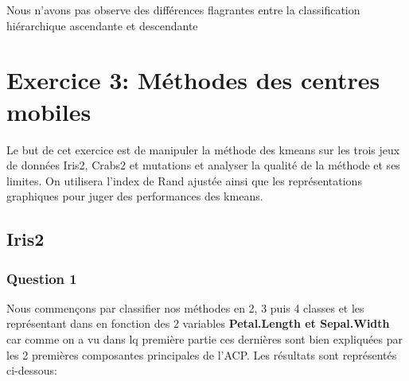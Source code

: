 \documentclass[10pt]{article}
\begin{document}
	Nous n'avons pas observe des différences flagrantes entre la classification hiérarchique ascendante et descendante
	
	\section{ Exercice 3: Méthodes des centres mobiles}
	Le but de cet exercice est de manipuler la méthode des kmeans sur les trois jeux de données Iris2, Crabs2 et mutations et analyser la qualité de la méthode et ses limites. On utilisera l'index de Rand ajustée ainsi que les représentations graphiques pour juger des performances des kmeans.
	\subsection{Iris2}
	\subsubsection{Question 1}
	Nous commençons par classifier nos méthodes en 2, 3 puis 4 classes et les représentant dans en fonction des 2 variables \textbf{Petal.Length et Sepal.Width} car comme on a vu dans lq première partie ces dernières sont bien expliquées par les 2 premières composantes principales de l'ACP.  Les résultats sont représentés ci-dessous:
	
\end{document}
